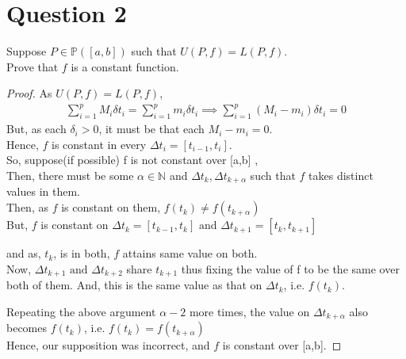 \documentclass[20pt,a4paper]{extarticle} %
\theoremstyle{definition}
\theoremstyle{definition}
\begin{document}
\section*{Question 2}
Suppose $P \in \mathbb{P}([a,b])$ such that $U(P,f)=L(P,f)$.\\
Prove that $f$ is a constant function.
\begin{proof}
	As $U(P,f)=L(P,f)$,
	\begin{eqnarray*}
		\sum_{i=1}^{p}M_i \delta t_i = \sum_{i=1}^{p}m_i \delta t_i
		\implies \sum_{i=1}^{p}(M_i-m_i) \delta t_i=0
	\end{eqnarray*}
	But, as each $\delta_i>0$, it must be that each $M_i-m_i=0$.\\
	Hence, $f$ is constant in every $\Delta t_i= [t_{i-1},t_i]$.\\
	So, suppose(if possible) f is not constant over [a,b]  ,\\
	Then, there must be some $\alpha \in \mathbb{N}$ and $\Delta t_k,\Delta t_{k+\alpha}$
	such that $f$ takes distinct values in them.\\
	Then, as $f$ is constant on them, $f(t_k)\neq f(t_{k+\alpha})$\\
	But, $f$ is constant on $\Delta t_k=[t_{k-1},t_k] \text{ and } \Delta t_{k+1}=[t_k,t_{k+1}]$

	and as, $t_k$, is in both, $f$ attains same value on both.\\

	Now, $\Delta t_{k+1} \text{ and } \Delta t_{k+2}$ share $t_{k+1}$ thus fixing
	the value of f to be the same over both of them. And, this is the same
	value as that on $\Delta t_k$, i.e. $f(t_k)$.

	Repeating the above argument $\alpha-2$ more times, the value on  $\Delta t_{k+\alpha}$
	also becomes $f(t_k)$, i.e. $f(t_k)=f(t_{k+\alpha})$\\
	Hence, our supposition was incorrect, and $f$ is constant over [a,b].
\end{proof}
\newpage
\end{document}
